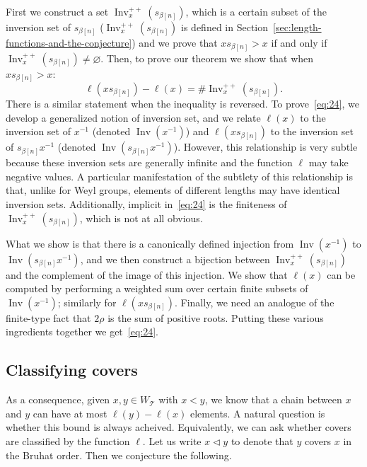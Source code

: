 \documentclass[ALCO,ThmDefs,Unicode]{cedram}
\DeclareMathOperator{\Inv}{Inv}
\newcommand{\cT}{\mathcal{T}}
\newcommand{\WTits}{W_{\TitsCone}}
\newcommand{\TitsCone}{\cT}
\begin{document}
First we construct a set $\Inv^{++}_x(s_{\beta[n]})$, which is a certain subset of the inversion set of $s_{\beta[n]}$ ($\Inv^{++}_x(s_{\beta[n]})$ is defined in Section~\ref{sec:length-functions-and-the-conjecture}) and we prove that $ x s_{\beta[n]} > x$ if and only if $\Inv^{++}_x(s_{\beta[n]}) \neq \varnothing$. Then, to prove our theorem we show that when $x s_{\beta[n]} > x$:
\begin{equation}\label{eq:24}
\ell(x s_{\beta[n]}) - \ell(x) = \# \Inv^{++}_x(s_{\beta[n]}).
\end{equation}
There is a similar statement when the inequality is reversed. To prove~\eqref{eq:24}, we develop a generalized notion of inversion set, and we relate $\ell(x)$ to the inversion set of $x^{-1}$ (denoted $\Inv(x^{-1})$) and $\ell(x s_{\beta[n]})$ to the inversion set of $s_{\beta[n]}x^{-1}$ (denoted $\Inv(s_{\beta[n]}x^{-1})$). However, this relationship is very subtle because these inversion sets are generally infinite and the function $\ell$ may take negative values. A particular manifestation of the subtlety of this relationship is that, unlike for Weyl groups, elements of different lengths may have identical inversion sets. Additionally, implicit in~\eqref{eq:24} is the finiteness of $\Inv^{++}_x(s_{\beta[n]})$, which is not at all obvious.

What we show is that there is a canonically defined injection from $\Inv(x^{-1})$ to $\Inv(s_{\beta[n]}x^{-1})$, and we then construct a bijection between $\Inv^{++}_x(s_{\beta[n]})$ and the complement of the image of this injection. We show that $\ell(x)$ can be computed by performing a weighted sum over certain finite subsets of $\Inv(x^{-1})$; similarly for $\ell(xs_{\beta[n]})$. Finally, we need an analogue of the finite-type fact that $2\rho$ is the sum of positive roots. Putting these various ingredients together we get~\eqref{eq:24}.

\subsection{Classifying covers}

As a consequence, given $x,y \in \WTits$ with $x < y$, we know that a chain between $x$ and $y$ can have at most $\ell(y) - \ell(x)$ elements. A natural question is whether this bound is always acheived. Equivalently, we can ask whether covers are classified by the function $\ell$. Let us write $x \lhd y$ to denote that $y$ covers $x$ in the Bruhat order. Then we conjecture the following.
\end{document}
